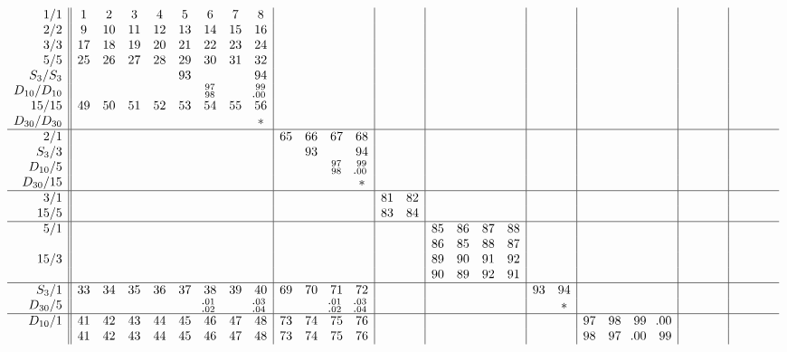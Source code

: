\documentclass[12pt,a4paper]{amsart}
\begin{document}
\begin{align*}
\begin{array}{r||cccccccc|cccc|cc|cccc|cc|cccc|cccc|cccc}
1/1&
 1& 2& 3& 4& 5& 6& 7& 8&&&&&&&&&&&&&&&&&&&&&&&&\\
2/2&
 9&10&11&12&13&14&15&16&&&&&&&&&&&&&&&&&&&&&&&&\\
3/3&
17&18&19&20&21&22&23&24&&&&&&&&&&&&&&&&&&&&&&&&\\
5/5&
25&26&27&28&29&30&31&32&&&&&&&&&&&&&&&&&&&&&&&&\\
S_3/S_3&
  &  &  &  &93&  &  &94&&&&&&&&&&&&&&&&&&&&&&&&\\
D_{10}/D_{10}&
&&&&&^{97}_{98}&&^{99}_{\llap{.}00}&&&&&&&&&&&&&&&&&&&&&&\\
15/15&
49&50&51&52&53&54&55&56&&&&&&&&&&&&&&&&&&&&&&&&\\
D_{30}/D_{30}&
  &  &  &  &  &  &  & *&&&&&&&&&&&&&&&&&&&&&&&&\\ \hline
2/1&
  &  &  &  &  &  &  &  &65&66&67&68&&&&&&&&&&&&&&&&&&&&\\
S_3/3&
  &  &  &  &  &  &  &  &  &93&  &94&&&&&&&&&&&&&&&&&&&&\\
D_{10}/5
&&&&&&&&&&&^{97}_{98}&^{99}_{\llap{.}00}&&&&&&&&&&&&&&&&&&\\
D_{30}/15&
  &  &  &  &  &  &  &  &  &  &  & *&&&&&&&&&&&&&&&&&&&&\\ \hline
3/1&
  &  &  &  &  &  &  &  &  &  &  &  &81&82&&&&&&&&&&&&&&&&&&\\
15/5&
  &  &  &  &  &  &  &  &  &  &  &  &83&84&&&&&&&&&&&&&&&&&&\\ \hline
5/1&
  &  &  &  &  &  &  &  &  &  &  &  &  &  &85&86&87&88&&&&&&&&&&&&&&\\
&
  &  &  &  &  &  &  &  &  &  &  &  &  &  &86&85&88&87&&&&&&&&&&&&&&\\
15/3&
  &  &  &  &  &  &  &  &  &  &  &  &  &  &89&90&91&92&&&&&&&&&&&&&&\\
&
  &  &  &  &  &  &  &  &  &  &  &  &  &  &90&89&92&91&&&&&&&&&&&&&&\\ \hline
S_3/1&
33&34&35&36&37&38&39&40&69&70&71&72&  &  &  &  &  &  &93&94&&&&&&&&&&&&\\
D_{30}/5&
&&&&&^{\llap{.}01}_{\llap{.}02}&&^{\llap{.}03}_{\llap{.}04}&&&^{\llap{.}01}_{\llap{.}02}&^{\llap{.}03}_{\llap{.}04}&&&&&&&  & *&&&&&&&&&&&&\\ \hline
D_{10}/1&
41&42&43&44&45&46&47&48&73&74&75&76&  &  &  &  &  &  &  &  &97&98&99&\llap{.}00&&&&&&&&\\
&
41&42&43&44&45&46&47&48&73&74&75&76&  &  &  &  &  &  &  &  &98&97&\llap{.}00&99&&&&&&&&\\

\end{array}
\end{align*}
\end{document}
